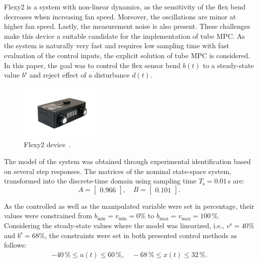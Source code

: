 \documentclass[letterpaper, 10 pt, conference]{ieeeconf}
\begin{document}
Flexy2 is a system with non-linear dynamics, as the sensitivity of the flex bend decreases when increasing fan speed. Moreover, the oscillations are minor at higher fan speed. Lastly, the measurement noise is also present. These challenges make this device a suitable candidate for the implementation of tube MPC. As the system is naturally very fast and requires low sampling time with fast evaluation of the control inputs, the explicit solution of tube MPC is considered. In this paper, the goal was to control the flex sensor bend $b(t)$ to a steady-state value $b^\text{s}$ and reject effect of a disturbance $d(t)$.

\begin{figure}
	\begin{center}
		\includegraphics[width=0.35\textwidth]{images/flexy2}
		\caption{Flexy2 device~\cite{flexy2}.}
		\label{fig:flexy2}
	\end{center}
\end{figure}

The model of the system was obtained through experimental identification based on several step responses. The matrices of the nominal state-space system, transformed into the discrete-time domain using sampling time $T_\mathrm{s} = 0.01$\,s are:
\begin{equation}
	\label{eq:model_A_B} 
		A = \begin{bmatrix}
			0.966
		\end{bmatrix}, \quad 
		B = \begin{bmatrix}
			0.101
		\end{bmatrix}. 
\end{equation}

As the controlled as well as the manipulated variable were set in percentage, their values were constrained from $b_{\min} = v_{\min} = 0\%$ to $b_{\max} = v_{\max} = 100\,\%$. Considering the steady-state values where the model was linearized, i.e., $ v^\mathrm{s} = 40\%$ and $ b^\mathrm{s} = 68\%$, the constraints were set in both presented control methods as follows: 
\begin{eqnarray}
\label{eq:const_u_y}
	-40\,\% \le u(t) \le 60\,\%, \quad -68\,\% \le x(t) \le 32\,\%.
\end{eqnarray}
\end{document}
